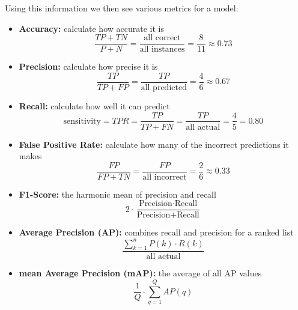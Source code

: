 Using this information we then see various metrics for a model:
\begin{itemize}
    \item \textbf{Accuracy:} calculate how accurate it is
    \begin{equation} \tag{Accuracy}
        \frac{TP + TN}{P + N} = \frac{\text{all correct}}{\text{all instances}} = \frac{8}{11} \approx 0.73
    \end{equation}
    \item \textbf{Precision:} calculate how precise it is
    \begin{equation} \tag{Precision}
        \frac{TP}{TP + FP} = \frac{TP}{\text{all predicted}} = \frac{4}{6} \approx 0.67
    \end{equation}
    \item \textbf{Recall:} calculate how well it can predict
    \begin{equation} \tag{Recall}
        \text{sensitivity} = TPR = \frac{TP}{TP + FN} = \frac{TP}{\text{all actual}} = \frac{4}{5} = 0.80
    \end{equation}
    \item \textbf{False Positive Rate:} calculate how many of the incorrect predictions it makes
    \begin{equation} \tag{FPR}
        \frac{FP}{FP + TN} = \frac{FP}{\text{all incorrect}} = \frac{2}{6} \approx 0.33
    \end{equation}
    \item \textbf{F1-Score:} the harmonic mean of precision and recall
    \begin{equation} \tag{F1-Score}
        2 \cdot \frac{\text{Precision} \cdot \text{Recall}}{\text{Precision} + \text{Recall}}
    \end{equation}
    \item \textbf{Average Precision (AP):} combines recall and precision for a ranked list
    \begin{equation} \tag{AP}
        \frac{\sum^n_{k=1} P(k) \cdot R(k)}{\text{all actual}}
    \end{equation}
    \item \textbf{mean Average Precision (mAP):} the average of all AP values
    \begin{equation} \tag{mAP}
        \frac{1}{Q} \cdot \sum^Q_{q=1} AP(q)
    \end{equation}
\end{itemize}

\newpage